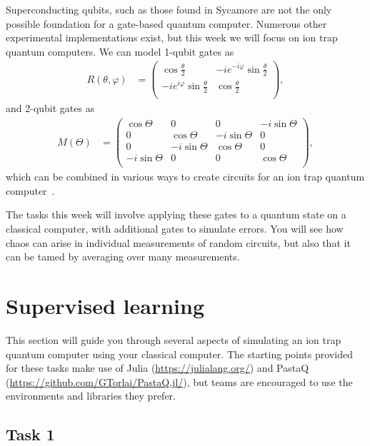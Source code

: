 \documentclass[12pt]{article}
\renewcommand{\phi}{\varphi}
\begin{document}
Superconducting qubits, such as those found in Sycamore are not the only possible foundation for a gate-based quantum computer.
Numerous other experimental implementations exist, but this week we will focus on ion trap quantum computers.
We can model 1-qubit gates as
\begin{align}
	R(\theta, \phi)
	&= \begin{pmatrix}
			\cos{\frac{\theta}{2}} & -i e^{-i \phi} \sin{\frac{\theta}{2}} \\
			-i e^{i \phi} \sin{\frac{\theta}{2}} & \cos{\frac{\theta}{2}} \\
		\end{pmatrix},
\end{align}
and 2-qubit gates as
\begin{align}
	M(\Theta)
	&= \begin{pmatrix}
			\cos{\Theta} & 0 & 0 & -i \sin{\Theta} \\
			0 & \cos{\Theta} & -i \sin{\Theta} & 0 \\
			0 & -i \sin{\Theta} & \cos{\Theta} & 0 \\
			-i \sin{\Theta} & 0 & 0 & \cos{\Theta} \\
		\end{pmatrix},
\end{align}
which can be combined in various ways to create circuits for an ion trap quantum computer~\cite{sorensen1999quantum,pogorelov2021compact}.

The tasks this week will involve applying these gates to a quantum state on a classical computer, with additional gates to simulate errors.
You will see how chaos can arise in individual measurements of random circuits, but also that it can be tamed by averaging over many measurements.


\section*{Supervised learning}

This section will guide you through several aspects of simulating an ion trap quantum computer using your classical computer.
The starting points provided for these tasks make use of Julia (\url{https://julialang.org/}) and PastaQ (\url{https://github.com/GTorlai/PastaQ.jl/}), but teams are encouraged to use the environments and libraries they prefer.


\subsection*{Task 1}
\end{document}
